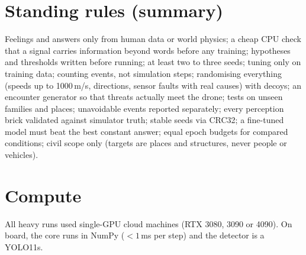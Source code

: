 \documentclass[10pt]{article}
\begin{document}
{\small


}

\appendix
\section{Standing rules (summary)}
Feelings and answers only from human data or world physics; a cheap CPU check that a signal carries information beyond words before
any training; hypotheses and thresholds written before running; at least two to three seeds; tuning only on training data; counting
events, not simulation steps; randomising everything (speeds up to 1000\,m/s, directions, sensor faults with real causes) with
decoys; an encounter generator so that threats actually meet the drone; tests on unseen families and places; unavoidable events
reported separately; every perception brick validated against simulator truth; stable seeds via CRC32; a fine-tuned model must beat
the best constant answer; equal epoch budgets for compared conditions; civil scope only (targets are places and structures, never
people or vehicles).

\section{Compute}
All heavy runs used single-GPU cloud machines (RTX 3080, 3090 or 4090). On board, the core runs in NumPy
($<1$\,ms per step) and the detector is a YOLO11s.


\end{document}
